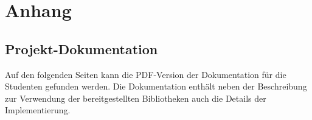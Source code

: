 \documentclass[oneside]{elaboration}
\begin{document}
\printbibliography

\appendix{}
\chapter{Anhang}
\label{chp:anhang}

\section{Projekt-Dokumentation}
\label{sec:projekt-dokumentation}

Auf den folgenden Seiten kann die PDF-Version der Dokumentation für die
Studenten gefunden werden. Die Dokumentation enthält neben der Beschreibung zur
Verwendung der bereitgestellten Bibliotheken auch die Details der
Implementierung.
\end{document}

